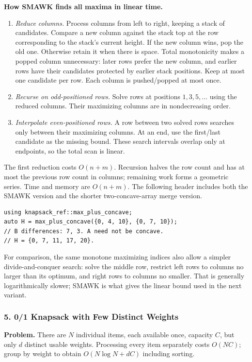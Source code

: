\textbf{How SMAWK finds all maxima in linear time.}
\begin{enumerate}
\item \emph{Reduce columns.} Process columns from left to right,
keeping a stack of candidates. Compare a new column against the
stack top at the row corresponding to the stack's current height.
If the new column wins, pop the old one. Otherwise retain it when
there is space. Total monotonicity makes a popped column unnecessary:
later rows prefer the new column, and earlier rows have their
candidates protected by earlier stack positions. Keep at most one
candidate per row. Each column is pushed/popped at most once.
\item \emph{Recurse on odd-positioned rows.} Solve rows at positions
$1,3,5,\ldots$ using the reduced columns. Their maximizing columns
are in nondecreasing order.
\item \emph{Interpolate even-positioned rows.} A row between two
solved rows searches only between their maximizing columns. At an
end, use the first/last candidate as the missing bound. These search
intervals overlap only at endpoints, so the total scan is linear.
\end{enumerate}
The first reduction costs $O(n+m)$. Recursion halves the row count
and has at most the previous row count in columns; remaining work
forms a geometric series. Time and memory are $O(n+m)$.
The following header includes both the SMAWK version and the shorter
two-concave-array merge version.

\begin{minipage}{\linewidth}
\begin{lstlisting}[style=C++,showstringspaces=false]
using knapsack_ref::max_plus_concave;
auto H = max_plus_concave({0, 4, 10}, {0, 7, 10});
// B differences: 7, 3. A need not be concave.
// H = {0, 7, 11, 17, 20}.
\end{lstlisting}
\end{minipage}
\par
For comparison, the same monotone maximizing indices also allow a
simpler divide-and-conquer search: solve the middle row, restrict
left rows to columns no larger than its optimum, and right rows to
columns no smaller. That is generally logarithmically slower;
SMAWK is what gives the linear bound used in the next variant.

\subsubsection{5. 0/1 Knapsack with Few Distinct Weights}
\textbf{Problem.} There are $N$ individual items, each available once,
capacity $C$, but only $d$ distinct usable weights. Processing every
item separately costs $O(NC)$; group by weight to obtain
$O(N\log N+dC)$ including sorting.

